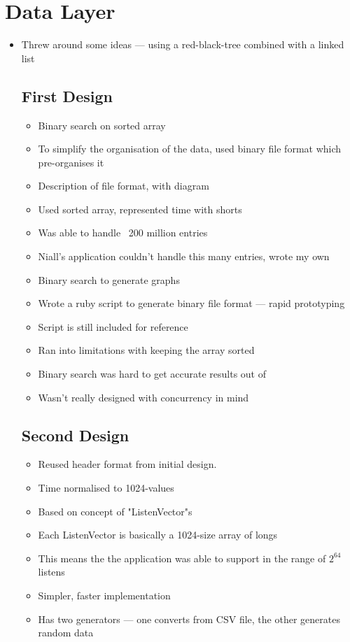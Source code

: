 \section{Data Layer}
\begin{itemize}
\item Threw around some ideas --- using a red-black-tree combined with a linked list
\subsection{First Design}
\begin{itemize}
\item Binary search on sorted array\cite{Data.java}
\item To simplify the organisation of the data, used binary file format which pre-organises it
\item Description of file format, with diagram
\item Used sorted array, represented time with shorts
\item Was able to handle ~200 million entries
\item Niall's application couldn't handle this many entries, wrote my own
\item Binary search to generate graphs
\item Wrote a ruby script to generate binary file format --- rapid prototyping
\item Script is still included for reference
\item Ran into limitations with keeping the array sorted
\item Binary search was hard to get accurate results out of
\item Wasn't really designed with concurrency in mind
\end{itemize}
\subsection{Second Design}
\begin{itemize}
\item Reused header format from initial design.
\item Time normalised to 1024-values
\item Based on concept of "ListenVector"s
\item Each ListenVector is basically a 1024-size array of longs
\item This means the the application was able to support in the range of $2^{64}$ listens
\item Simpler, faster implementation
\item Has two generators --- one converts from CSV file, the other generates random data
\end{itemize}
\end{itemize}

